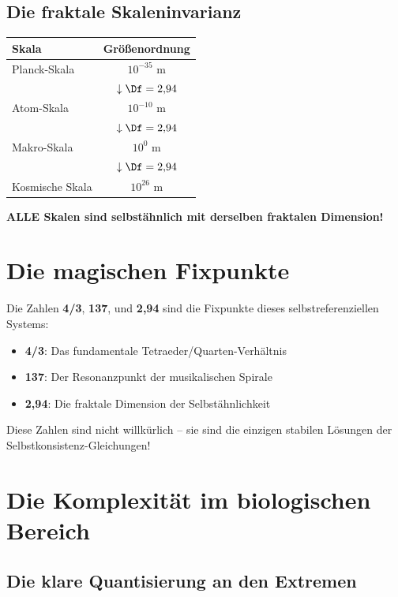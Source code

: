 	\subsection{Die fraktale Skaleninvarianz}
	
	\begin{center}
		\begin{tabular}{lc}
			\toprule
			Skala & Größenordnung\\
			\midrule
			Planck-Skala & $10^{-35}$ m\\
			& $\downarrow \Df = 2{,}94$\\
			Atom-Skala & $10^{-10}$ m\\
			& $\downarrow \Df = 2{,}94$\\
			Makro-Skala & $10^0$ m\\
			& $\downarrow \Df = 2{,}94$\\
			Kosmische Skala & $10^{26}$ m\\
			\bottomrule
		\end{tabular}
	\end{center}
	
	\textbf{ALLE Skalen sind selbstähnlich mit derselben fraktalen Dimension!}
	
	\section{Die magischen Fixpunkte}
	
	Die Zahlen \textbf{4/3}, \textbf{137}, und \textbf{2{,}94} sind die Fixpunkte dieses selbstreferenziellen Systems:
	
	\begin{itemize}
		\item \textbf{4/3}: Das fundamentale Tetraeder/Quarten-Verhältnis
		\item \textbf{137}: Der Resonanzpunkt der musikalischen Spirale
		\item \textbf{2{,}94}: Die fraktale Dimension der Selbstähnlichkeit
	\end{itemize}
	
	Diese Zahlen sind nicht willkürlich -- sie sind die einzigen stabilen Lösungen der Selbstkonsistenz-Gleichungen!
	
	\section{Die Komplexität im biologischen Bereich}
	
	\subsection{Die klare Quantisierung an den Extremen}
	
